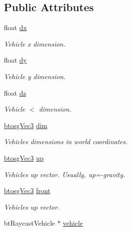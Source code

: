 \subsection*{Public Attributes}
\begin{DoxyCompactItemize}
\item 
float \mbox{\hyperlink{classbtosgVehicle_aed23010bba3c34158abd4548328b3819}{dx}}
\begin{DoxyCompactList}\small\item\em Vehicle x dimension. \end{DoxyCompactList}\item 
float \mbox{\hyperlink{classbtosgVehicle_ae124e1cd8c424080d7be7c47edb07eb1}{dy}}
\begin{DoxyCompactList}\small\item\em Vehicle y dimension. \end{DoxyCompactList}\item 
float \mbox{\hyperlink{classbtosgVehicle_a39857392dc4882886964c1beefa46268}{dz}}
\begin{DoxyCompactList}\small\item\em Vehicle $<$ dimension. \end{DoxyCompactList}\item 
\mbox{\hyperlink{classbtosgVec3}{btosg\+Vec3}} \mbox{\hyperlink{classbtosgVehicle_a2173f99ca0719929aa5a1c890927aca3}{dim}}
\begin{DoxyCompactList}\small\item\em Vehicle\textquotesingle{}s dimensions in world coordinates. \end{DoxyCompactList}\item 
\mbox{\hyperlink{classbtosgVec3}{btosg\+Vec3}} \mbox{\hyperlink{classbtosgVehicle_a84705afaa9e37bb8a0bd7f6b6f291c26}{up}}
\begin{DoxyCompactList}\small\item\em Vehicle\textquotesingle{}s up vector. Usually, up=-\/gravity. \end{DoxyCompactList}\item 
\mbox{\hyperlink{classbtosgVec3}{btosg\+Vec3}} \mbox{\hyperlink{classbtosgVehicle_a33d6c0dc296ac54ec4a37e34332fa446}{front}}
\begin{DoxyCompactList}\small\item\em Vehicle\textquotesingle{}s up vector. \end{DoxyCompactList}\item 
bt\+Raycast\+Vehicle $\ast$ \mbox{\hyperlink{classbtosgVehicle_ac45b117f8b523f7040de99639deb7522}{vehicle}}

\end{DoxyCompactItemize}
